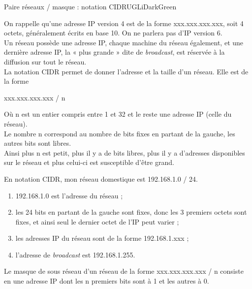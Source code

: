 \documentclass[a4paper,12pt,french]{article}
\begin{document}

\begin{encadrecolore}{Paire réseaux / masque : notation CIDR}{UGLiDarkGreen}

On rappelle qu'une adresse IP version 4 est de la forme xxx.xxx.xxx.xxx, soit 4 octets, généralement écrits en base 10. On ne parlera pas d'IP version 6.\\

Un réseau possède une adresse IP, chaque machine du réseau également, et une dernière adresse IP, la « plus grande » dite de \textit{broadcast}, est réservée à la diffusion sur tout le réseau.\\

La notation CIDR permet de donner l'adresse et la taille d'un réseau. Elle est de la forme 
\begin{center}
xxx.xxx.xxx.xxx / n
\end{center}
Où n est un entier compris entre 1 et 32 et le reste une adresse IP (celle du réseau).\\
Le nombre n correspond au nombre de bits fixes en partant de la gauche, les autres bits sont libres.\\
Ainsi plus n est petit, plus il y a de bits libres, plus il y a d'adresses disponibles sur le réseau et plus celui-ci est susceptible d'être grand.
\end{encadrecolore}

\begin{exemple}
En notation CIDR, mon réseau domestique est 192.168.1.0 / 24.
\begin{enumerate}[--]
	\item 192.168.1.0 est l'adresse du réseau ;
	\item les 24 bits en partant de la gauche sont fixes, donc les 3 premiers octets sont fixes, et ainsi seul le dernier octet de l'IP peut varier ;
	\item les adresses IP du réseau sont de la forme 192.168.1.xxx ;
	\item l'adresse de \textit{broadcast} est 192.168.1.255.
\end{enumerate}
\end{exemple}

\begin{definition}
Le masque de sous réseau d'un réseau de la forme xxx.xxx.xxx.xxx / n consiste en une adresse IP dont les n premiers bits sont à 1 et les autres à 0.
\end{definition}
\end{document}
